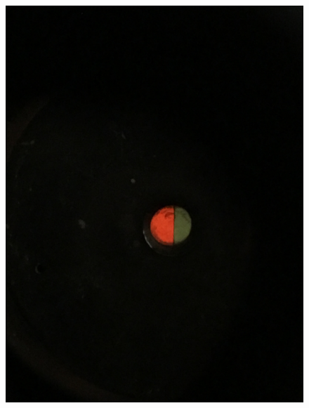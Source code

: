 \begin{figure}[h!]
\begin{minipage}{0.25\linewidth}
		\includegraphics[width=\linewidth]{biquarz/red-blue.jpg}
	\end{minipage}
	\begin{minipage}{0.25\linewidth}

\end{minipage}
\end{figure}
